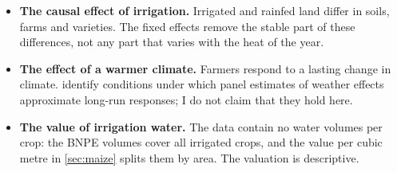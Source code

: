 \begin{itemize}
  \item \textbf{The causal effect of irrigation.} Irrigated and rainfed land differ in soils, farms and varieties. The fixed effects remove the stable part of these differences, not any part that varies with the heat of the year.
  \item \textbf{The effect of a warmer climate.} Farmers respond to a lasting change in climate. \textcite{merel2021} identify conditions under which panel estimates of weather effects approximate long-run responses; I do not claim that they hold here.
  \item \textbf{The value of irrigation water.} The data contain no water volumes per crop: the BNPE volumes cover all irrigated crops, and the value per cubic metre in \cref{sec:maize} splits them by area. The valuation is descriptive.
\end{itemize}
